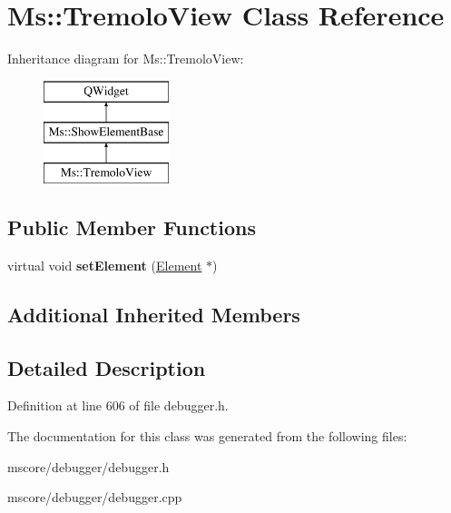 \hypertarget{class_ms_1_1_tremolo_view}{}\section{Ms\+:\+:Tremolo\+View Class Reference}
\label{class_ms_1_1_tremolo_view}
Inheritance diagram for Ms\+:\+:Tremolo\+View\+:\begin{figure}[H]
\begin{center}
\leavevmode
\includegraphics[height=3.000000cm]{class_ms_1_1_tremolo_view}
\end{center}
\end{figure}
\subsection*{Public Member Functions}
\begin{DoxyCompactItemize}
\item 
\mbox{\label{class_ms_1_1_tremolo_view_a77d769355fa54783ba285ad3d6f9da8b}} 
virtual void {\bfseries set\+Element} (\hyperlink{class_ms_1_1_element}{Element} $\ast$)
\end{DoxyCompactItemize}
\subsection*{Additional Inherited Members}


\subsection{Detailed Description}


Definition at line 606 of file debugger.\+h.



The documentation for this class was generated from the following files\+:\begin{DoxyCompactItemize}
\item 
mscore/debugger/debugger.\+h\item 
mscore/debugger/debugger.\+cpp\end{DoxyCompactItemize}

